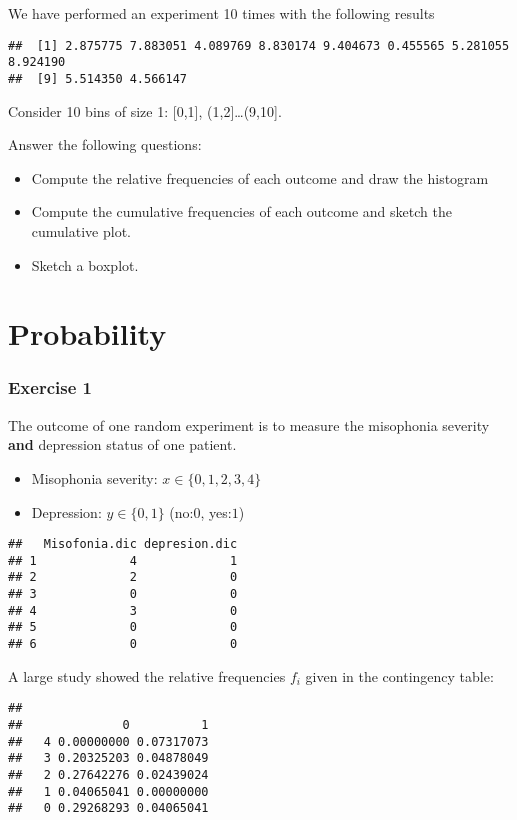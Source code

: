 \documentclass[
]{book}
\providecommand{\tightlist}{%
  \setlength{\itemsep}{0pt}\setlength{\parskip}{0pt}}
\begin{document}
We have performed an experiment 10 times with the following results

\begin{verbatim}
##  [1] 2.875775 7.883051 4.089769 8.830174 9.404673 0.455565 5.281055 8.924190
##  [9] 5.514350 4.566147
\end{verbatim}

Consider 10 bins of size 1: {[}0,1{]}, (1,2{]}\ldots(9,10{]}.

Answer the following questions:

\begin{itemize}
\item
  Compute the relative frequencies of each outcome and draw the histogram
\item
  Compute the cumulative frequencies of each outcome and sketch the cumulative plot.
\item
  Sketch a boxplot.
\end{itemize}

\hypertarget{probability-3}{%
\section{Probability}\label{probability-3}}

\hypertarget{exercise-1-1}{%
\subsubsection{Exercise 1}\label{exercise-1-1}}

The outcome of one random experiment is to measure the misophonia severity \textbf{and} depression status of one patient.

\begin{itemize}
\tightlist
\item
  Misophonia severity: \(x\in \{0,1,2,3,4\}\)
\item
  Depression: \(y\in \{0,1\}\) (no:\(0\), yes:\(1\))
\end{itemize}

\begin{verbatim}
##   Misofonia.dic depresion.dic
## 1             4             1
## 2             2             0
## 3             0             0
## 4             3             0
## 5             0             0
## 6             0             0
\end{verbatim}

A large study showed the relative frequencies \(f_i\) given in the contingency table:

\begin{verbatim}
##    
##              0          1
##   4 0.00000000 0.07317073
##   3 0.20325203 0.04878049
##   2 0.27642276 0.02439024
##   1 0.04065041 0.00000000
##   0 0.29268293 0.04065041
\end{verbatim}
\end{document}
